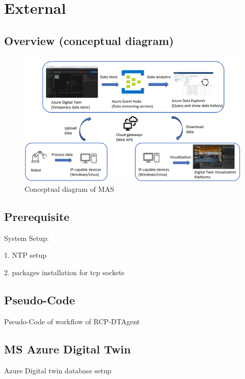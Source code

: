 \section{External}
\subsection{Overview (conceptual diagram)}

\begin{figure}[htb]
\includegraphics[width=\textwidth]{figures/DT_Conceptual_Diagram.png}
\centering
\caption{Conceptual diagram of MAS\label{fig: DTConceptual}}
\end{figure}



\subsection{Prerequisite}
System Setup: 


1. NTP setup


2. packages installation for tcp sockets


\subsection{Pseudo-Code}
Pseudo-Code of workflow of RCP-DTAgent

\subsection{MS Azure Digital Twin}
Azure Digital twin database setup